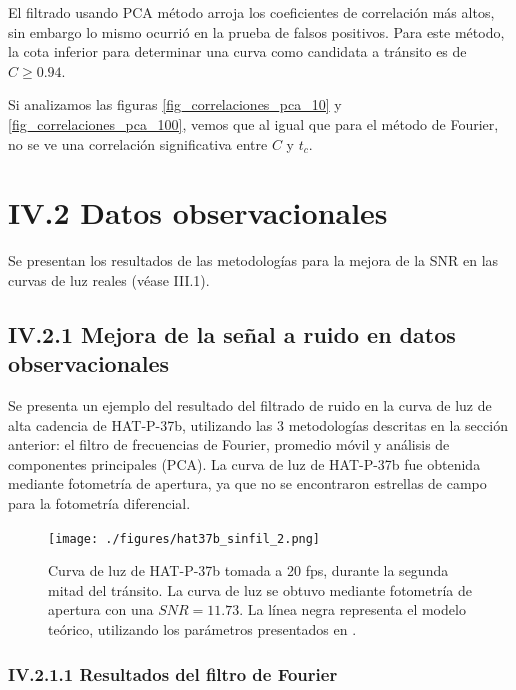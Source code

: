 El filtrado usando PCA método arroja los coeficientes de correlación más altos, sin embargo lo mismo ocurrió en la prueba de falsos positivos. Para este método, la cota inferior para determinar una curva como candidata a tránsito es de $C \geq 0.94 $. 

Si analizamos las figuras  \ref{fig_correlaciones_pca_10} y \ref{fig_correlaciones_pca_100}, vemos que al igual que para el método de Fourier, no se ve una correlación significativa entre $C$ y $t_{c}$. 

\section*{IV.2 Datos observacionales}

Se presentan los resultados de las metodologías para la mejora de la
SNR en las curvas de luz reales (véase III.1).

\subsection*{IV.2.1 Mejora de la señal a ruido en datos observacionales}

Se presenta un ejemplo del resultado del filtrado de ruido en la curva de luz de alta cadencia de HAT-P-37b, utilizando las 3 metodologías descritas en la sección anterior: el filtro de frecuencias de Fourier, promedio móvil y análisis de componentes principales (PCA). La curva de luz de HAT-P-37b fue obtenida mediante fotometría de apertura, ya que no se encontraron estrellas de campo para la fotometría diferencial.

\begin{figure}[h!]
	\centering
	  \texttt{[image: ./figures/hat37b\_sinfil\_2.png]}
	 \caption{Curva de luz de HAT-P-37b tomada a 20 fps, durante la segunda mitad del tránsito. La curva de luz se obtuvo mediante fotometría de apertura con una $SNR=11.73$. La línea negra representa el modelo teórico, utilizando los parámetros presentados en \cite{bakos2012hat}.}
	  \label{fig_transito_hat37b}
  \end{figure}


\subsubsection*{IV.2.1.1 Resultados del filtro de Fourier}

